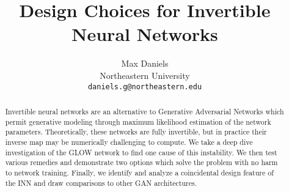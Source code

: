 \documentclass{article}
\title{Design Choices for Invertible Neural Networks}
\author{%
  Max Daniels \\
  Northeastern University\\
  \texttt{daniels.g@northeastern.edu} \\
}
\begin{document}
\maketitle

\begin{abstract}
Invertible neural networks are an alternative to Generative Adversarial Networks which permit generative modeling through maximum likelihood estimation of the network parameters. Theoretically, these networks are fully invertible, but in practice their inverse map may be numerically challenging to compute. We take a deep dive investigation of the GLOW network to find one cause of this instability. We then test various remedies and demonstrate two options which solve the problem with no harm to network training. Finally, we identify and analyze a coincidental design feature of the INN and draw comparisons to other GAN architectures.
\end{abstract}








\small

\nocite{karras2019analyzing}
 

\end{document}
